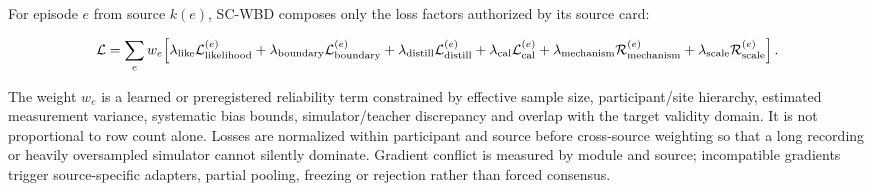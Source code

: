 For episode \(e\) from source \(k(e)\), SC-WBD composes only the loss factors
authorized by its source card:

\[
\mathcal L
=\sum_e w_e\!\left[
\lambda_{\rm like}\mathcal L^{(e)}_{\mathrm{likelihood}}
+\lambda_{\rm boundary}\mathcal L^{(e)}_{\mathrm{boundary}}
+\lambda_{\rm distill}\mathcal L^{(e)}_{\mathrm{distill}}
+\lambda_{\rm cal}\mathcal L^{(e)}_{\mathrm{cal}}
+\lambda_{\rm mechanism}\mathcal R^{(e)}_{\mathrm{mechanism}}
+\lambda_{\rm scale}\mathcal R^{(e)}_{\mathrm{scale}}
\right].
\]

The weight \(w_e\) is a learned or preregistered reliability term constrained
by effective sample size, participant/site hierarchy, estimated measurement
variance, systematic bias bounds, simulator/teacher discrepancy and overlap
with the target validity domain. It is not proportional to row count alone.
Losses are normalized within participant and source before cross-source
weighting so that a long recording or heavily oversampled simulator cannot
silently dominate. Gradient conflict is measured by module and source;
incompatible gradients trigger source-specific adapters, partial pooling,
freezing or rejection rather than forced consensus.

